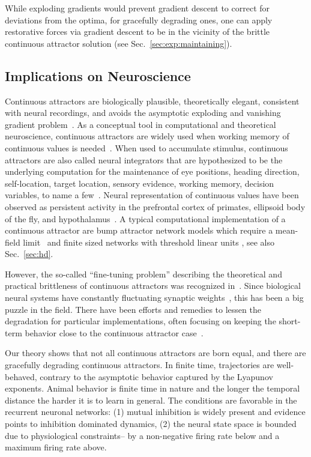 \documentclass{article}
\newcounter{ct}
\theoremstyle{definition}
\theoremstyle{remark}
\begin{document}
While exploding gradients would prevent gradient descent to correct for deviations from the optima,
for gracefully degrading ones, one can apply restorative forces via gradient descent to be in the vicinity of the brittle continuous attractor solution (see Sec.~\ref{sec:exp:maintaining}).


\subsection{Implications on Neuroscience}\label{sec:imp:neuroscience}
Continuous attractors are biologically plausible, theoretically elegant, consistent with neural recordings, and avoids the asymptotic exploding and vanishing gradient problem~\cite{Park2023a}.
As a conceptual tool in computational and theoretical neuroscience, continuous attractors are widely used when working memory of continuous values is needed~\cite{Dayan2001,Burak2009,Khona2022}.
When used to accumulate stimulus, continuous attractors are also called neural integrators that are hypothesized to be the underlying computation for the maintenance of eye positions, heading direction, self-location, target location, sensory evidence, working memory, decision variables, to name a few~\cite{seung1996,Seung2000,Romo1999}.
Neural representation of continuous values have been observed as persistent activity in the prefrontal cortex of primates, ellipsoid body of the fly, and hypothalamus~\cite{Romo1999,Noorman2022,Nair2023}.
A typical computational implementation of a continuous attractor are bump attractor network models which require a mean-field limit~\cite{Skaggs1995,Camperi1998,Renart2003} and finite sized networks with threshold linear units \cite{Noorman2022,Spalla2021}, see also Sec.~\ref{sec:hd}.

However, the so-called ``fine-tuning problem'' describing the theoretical and practical brittleness of continuous attractors was recognized in~\citep{seung1998}.
Since biological neural systems have constantly fluctuating synaptic weights~\cite{shimizu2021}, this has been a big puzzle in the field.
There have been efforts and remedies to lessen the degradation for particular implementations, often focusing on keeping the short-term behavior close to the continuous attractor case~\cite{Lim2012,Lim2013,Boerlin2013,Koulakov2002,Renart2003}.

Our theory shows that not all continuous attractors are born equal, and there are gracefully degrading continuous attractors.
In finite time, trajectories are well-behaved, contrary to the asymptotic behavior captured by the Lyapunov exponents.
Animal behavior is finite time in nature and the longer the temporal distance the harder it is to learn in general.
The conditions are favorable in the recurrent neuronal networks: (1) mutual inhibition is widely present and evidence points to inhibition dominated dynamics,
(2) the neural state space is bounded due to physiological constraints-- by a non-negative firing rate below and a maximum firing rate above.
\end{document}
